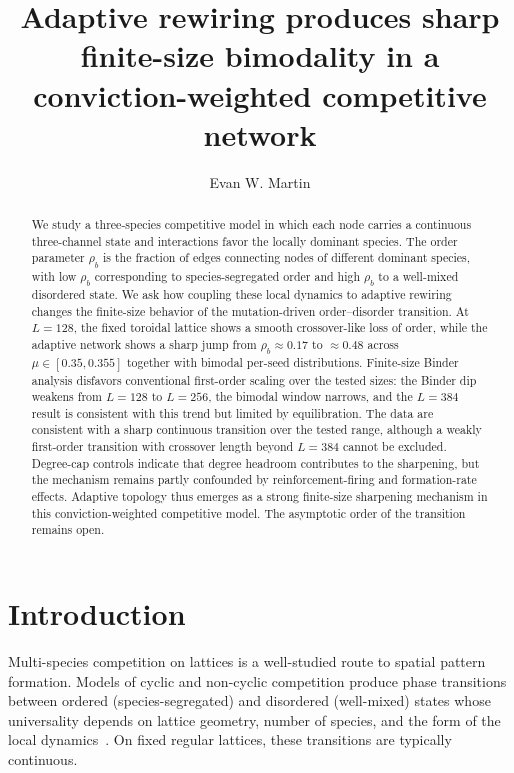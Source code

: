 \documentclass[preprint,12pt]{elsarticle}
\newcommand{\rb}{\rho_b}              %
\newcommand{\Lsys}{L}                 %
\begin{document}
\begin{frontmatter}

\title{Adaptive rewiring produces sharp finite-size
       bimodality in a conviction-weighted
       competitive network}

\author{Evan W. Martin}

\begin{abstract}
We study a three-species competitive model in which each node
carries a continuous three-channel state and interactions favor
the locally dominant species.
The order parameter $\rb$ is the fraction of edges connecting
nodes of different dominant species, with low $\rb$ corresponding
to species-segregated order and high $\rb$ to a well-mixed
disordered state.
We ask how coupling these local dynamics to adaptive rewiring
changes the finite-size behavior of the mutation-driven
order--disorder transition.
At $\Lsys = 128$, the fixed toroidal lattice shows a smooth
crossover-like loss of order, while the adaptive network shows a
sharp jump from $\rb \approx 0.17$ to $\approx 0.48$ across
$\mu \in [0.35, 0.355]$ together with bimodal per-seed
distributions.
Finite-size Binder analysis disfavors conventional first-order
scaling over the tested sizes: the Binder dip weakens from
$\Lsys = 128$ to $\Lsys = 256$, the bimodal window narrows, and
the $\Lsys = 384$ result is consistent with this trend but
limited by equilibration.
The data are consistent with a sharp continuous transition over
the tested range, although a weakly first-order transition with
crossover length beyond $\Lsys = 384$ cannot be excluded.
Degree-cap controls indicate that degree headroom contributes
to the sharpening, but the mechanism remains partly confounded
by reinforcement-firing and formation-rate effects.
Adaptive topology thus emerges as a strong finite-size
sharpening mechanism in this conviction-weighted competitive
model.
The asymptotic order of the transition remains open.
\end{abstract}

\end{frontmatter}

\section{Introduction}
\label{sec:intro}

Multi-species competition on lattices is a well-studied route to
spatial pattern formation.  Models of cyclic and non-cyclic
competition produce phase transitions between ordered
(species-segregated) and disordered (well-mixed) states whose
universality depends on lattice geometry, number of species,
and the form of the local
dynamics~\cite{szabo2007evolutionary,reichenbach2007mobility,szolnoki2014cyclic}.
On fixed regular lattices, these transitions are typically continuous.
\end{document}
